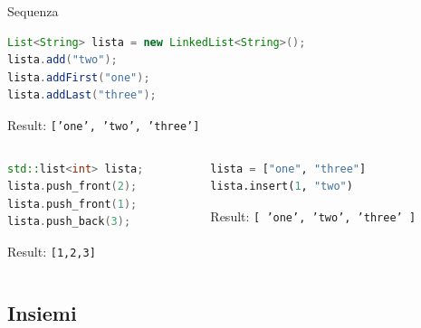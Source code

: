 \begin{frame}[fragile,shrink=10]{Sequenza}


\vspace{-6pt}
\begin{myboxtitle}[Java]
\begin{lstlisting}[language=Java]
List<String> lista = new LinkedList<String>();
lista.add("two"); 
lista.addFirst("one");
lista.addLast("three");
\end{lstlisting}
\alert{Result}: \texttt{['one', 'two', 'three']}
\end{myboxtitle}

\vspace{-6pt}
\begin{columns}[T]
\begin{column}{0.40\textwidth}
\begin{myboxtitle}[C++]
\begin{lstlisting}[language=C++]
std::list<int> lista;
lista.push_front(2);
lista.push_front(1);
lista.push_back(3);
\end{lstlisting}
\alert{Result}: \texttt{[1,2,3]}
\end{myboxtitle}
\end{column}
\begin{column}{0.56\textwidth}

\begin{myboxtitle}[Python]
\begin{lstlisting}[language=python]
lista = ["one", "three"]
lista.insert(1, "two")
\end{lstlisting}
\alert{Result}: \texttt{[ 'one', 'two', 'three' ]}
\end{myboxtitle}
\end{column}
\end{columns}



\end{frame}



\subsection{Insiemi}

